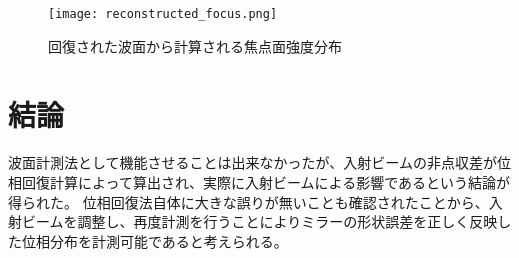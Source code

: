 \begin{figure}[!ht]
\centering
\texttt{[image: reconstructed\_focus.png]}
\caption{回復された波面から計算される焦点面強度分布}
\label{fig:reconstructed_focus}
\end{figure}


\section{結論}
\label{chap5_conclusion}

波面計測法として機能させることは出来なかったが、入射ビームの非点収差が位相回復計算によって算出され、実際に入射ビームによる影響であるという結論が得られた。
位相回復法自体に大きな誤りが無いことも確認されたことから、入射ビームを調整し、再度計測を行うことによりミラーの形状誤差を正しく反映した位相分布を計測可能であると考えられる。



